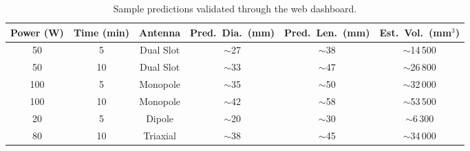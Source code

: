 \begin{table}[H]
\centering
\caption{Sample predictions validated through the web dashboard.}
\label{tab:sample-predictions}
\begin{tabular}{cccccc}
\toprule
\textbf{Power (W)} & \textbf{Time (min)} & \textbf{Antenna} & \textbf{Pred.\ Dia.\ (mm)} & \textbf{Pred.\ Len.\ (mm)} & \textbf{Est.\ Vol.\ (mm$^3$)} \\
\midrule
50  & 5  & Dual Slot & $\sim$27 & $\sim$38 & $\sim$14\,500 \\
50  & 10 & Dual Slot & $\sim$33 & $\sim$47 & $\sim$26\,800 \\
100 & 5  & Monopole  & $\sim$35 & $\sim$50 & $\sim$32\,000 \\
100 & 10 & Monopole  & $\sim$42 & $\sim$58 & $\sim$53\,500 \\
20  & 5  & Dipole    & $\sim$20 & $\sim$30 & $\sim$6\,300  \\
80  & 10 & Triaxial  & $\sim$38 & $\sim$45 & $\sim$34\,000 \\
\bottomrule
\end{tabular}
\end{table}
